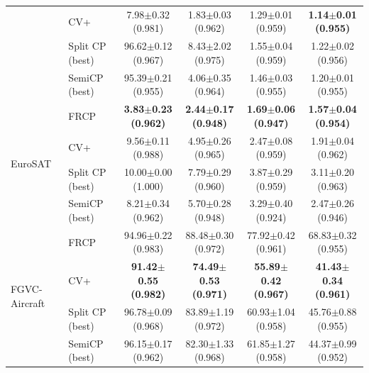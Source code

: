\begin{table}[t]
\begin{tabular}{llcccc}
 & CV+ & 7.98$\pm$0.32 {\scriptsize(0.981)} & 1.83$\pm$0.03 {\scriptsize(0.962)} & 1.29$\pm$0.01 {\scriptsize(0.959)} & \textbf{1.14$\pm$0.01 {\scriptsize(0.955)}}\\
 & Split CP (best) & 96.62$\pm$0.12 {\scriptsize(0.967)} & 8.43$\pm$2.02 {\scriptsize(0.975)} & 1.55$\pm$0.04 {\scriptsize(0.959)} & 1.22$\pm$0.02 {\scriptsize(0.956)}\\
 & SemiCP (best) & 95.39$\pm$0.21 {\scriptsize(0.955)} & 4.06$\pm$0.35 {\scriptsize(0.964)} & 1.46$\pm$0.03 {\scriptsize(0.955)} & 1.20$\pm$0.01 {\scriptsize(0.955)}\\
\midrule
\multirow{4}{*}{EuroSAT} & FRCP & \textbf{3.83$\pm$0.23 {\scriptsize(0.962)}} & \textbf{2.44$\pm$0.17 {\scriptsize(0.948)}} & \textbf{1.69$\pm$0.06 {\scriptsize(0.947)}} & \textbf{1.57$\pm$0.04 {\scriptsize(0.954)}}\\
 & CV+ & 9.56$\pm$0.11 {\scriptsize(0.988)} & 4.95$\pm$0.26 {\scriptsize(0.965)} & 2.47$\pm$0.08 {\scriptsize(0.959)} & 1.91$\pm$0.04 {\scriptsize(0.962)}\\
 & Split CP (best) & 10.00$\pm$0.00 {\scriptsize(1.000)} & 7.79$\pm$0.29 {\scriptsize(0.960)} & 3.87$\pm$0.29 {\scriptsize(0.959)} & 3.11$\pm$0.20 {\scriptsize(0.963)}\\
 & SemiCP (best) & 8.21$\pm$0.34 {\scriptsize(0.962)} & 5.70$\pm$0.28 {\scriptsize(0.948)} & 3.29$\pm$0.40 {\scriptsize(0.924)} & 2.47$\pm$0.26 {\scriptsize(0.946)}\\
\midrule
\multirow{4}{*}{FGVC-Aircraft} & FRCP & 94.96$\pm$0.22 {\scriptsize(0.983)} & 88.48$\pm$0.30 {\scriptsize(0.972)} & 77.92$\pm$0.42 {\scriptsize(0.961)} & 68.83$\pm$0.32 {\scriptsize(0.955)}\\
 & CV+ & \textbf{91.42$\pm$0.55 {\scriptsize(0.982)}} & \textbf{74.49$\pm$0.53 {\scriptsize(0.971)}} & \textbf{55.89$\pm$0.42 {\scriptsize(0.967)}} & \textbf{41.43$\pm$0.34 {\scriptsize(0.961)}}\\
 & Split CP (best) & 96.78$\pm$0.09 {\scriptsize(0.968)} & 83.89$\pm$1.19 {\scriptsize(0.972)} & 60.93$\pm$1.04 {\scriptsize(0.958)} & 45.76$\pm$0.88 {\scriptsize(0.955)}\\
 & SemiCP (best) & 96.15$\pm$0.17 {\scriptsize(0.962)} & 82.30$\pm$1.33 {\scriptsize(0.968)} & 61.85$\pm$1.27 {\scriptsize(0.958)} & 44.37$\pm$0.99 {\scriptsize(0.952)}\\
\bottomrule
\end{tabular}
\end{table}
